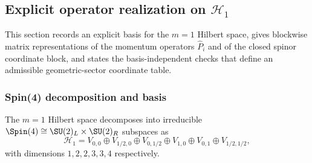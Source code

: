 \documentclass[11pt,a4paper]{article}
\begin{document}
\subsection{\texorpdfstring{Explicit operator realization on $\mathcal{H}_1$}{Explicit operator realization on H\_1}}
\label{p2:app:explicit-operators}

This section records an explicit basis for the $m=1$ Hilbert space, gives blockwise matrix representations of the momentum operators $\hat{P}_i$ and of the closed spinor coordinate block, and states the basis-independent checks that define an admissible geometric-sector coordinate table.

\subsubsection{Spin(4) decomposition and basis}
The $m=1$ Hilbert space decomposes into irreducible $\Spin(4)\cong \SU(2)_L\times \SU(2)_R$ subspaces as
\begin{equation}
\label{p2:eq:H1_decomp}
\mathcal{H}_1
=
V_{0,0}\oplus V_{1/2,0}\oplus V_{0,1/2}\oplus V_{1,0}\oplus V_{0,1}\oplus V_{1/2,1/2},
\end{equation}
with dimensions $1,2,2,3,3,4$ respectively.
\end{document}
